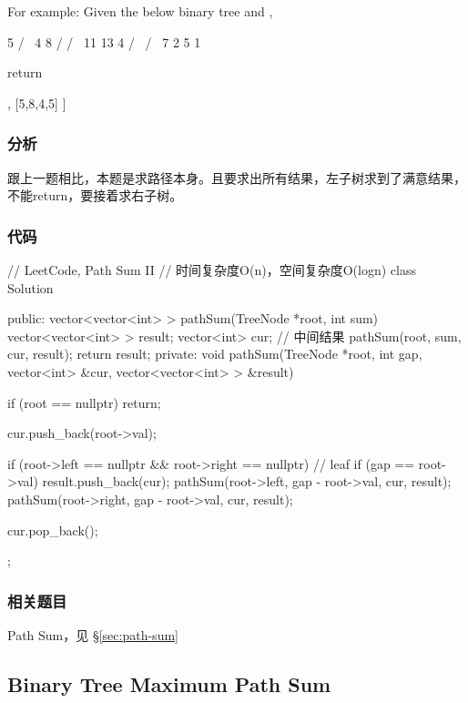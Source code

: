 For example:
Given the below binary tree and ,
\begin{Code}
          5
         / \
        4   8
       /   / \
      11  13  4
     /  \    / \
    7    2  5   1
\end{Code}
return
\begin{Code}
[
   [5,4,11,2],
   [5,8,4,5]
]
\end{Code}


\subsubsection{分析}
跟上一题相比，本题是求路径本身。且要求出所有结果，左子树求到了满意结果，不能return，要接着求右子树。

\subsubsection{代码}

\begin{Code}
// LeetCode, Path Sum II
// 时间复杂度O(n)，空间复杂度O(logn)
class Solution {
public:
    vector<vector<int> > pathSum(TreeNode *root, int sum) {
        vector<vector<int> > result;
        vector<int> cur; // 中间结果
        pathSum(root, sum, cur, result);
        return result;
    }
private:
    void pathSum(TreeNode *root, int gap, vector<int> &cur,
            vector<vector<int> > &result) {
        if (root == nullptr) return;

        cur.push_back(root->val);

        if (root->left == nullptr && root->right == nullptr) { // leaf
            if (gap == root->val)
                result.push_back(cur);
        }
        pathSum(root->left, gap - root->val, cur, result);
        pathSum(root->right, gap - root->val, cur, result);

        cur.pop_back();
    }
};
\end{Code}


\subsubsection{相关题目}
\begindot
\item Path Sum，见 \S \ref{sec:path-sum}
\myenddot


\subsection{Binary Tree Maximum Path Sum}
\label{sec:binary-tree-maximum-path-sum}


